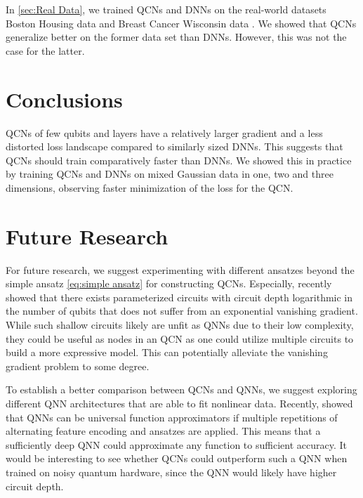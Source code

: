 In \autoref{sec:Real Data}, we trained QCNs and DNNs on the real-world datasets Boston Housing data \cite{boston} and Breast Cancer Wisconsin data \cite{cancer}. We showed that QCNs generalize better on the former data set than DNNs. However, this was not the case for the latter.  


\section{Conclusions}\label{sec:conclusion}
QCNs of few qubits and layers have a relatively larger gradient and a less distorted loss landscape compared to similarly sized DNNs. This suggests that QCNs should train comparatively faster than DNNs. We showed this in practice by training QCNs and DNNs on mixed Gaussian data in one, two and three dimensions, observing faster minimization of the loss for the QCN. 

\section{Future Research}\label{sec:future}
For future research, we suggest experimenting with different ansatzes beyond the simple ansatz \autoref{eq:simple ansatz} for constructing QCNs. Especially, \citet{Cerezo_2021} recently showed that there exists parameterized circuits with circuit depth logarithmic in the number of qubits that does not suffer from an exponential vanishing gradient. While such shallow circuits likely are unfit as QNNs due to their low complexity, they could be useful as nodes in an QCN as one could utilize multiple circuits to build a more expressive model. This can potentially alleviate the vanishing gradient problem to some degree.

To establish a better comparison between QCNs and QNNs, we suggest exploring different QNN architectures that are able to fit nonlinear data. Recently, \citet{Schuld_2021} showed that QNNs can be universal function approximators if multiple repetitions of alternating feature encoding and ansatzes are applied. This means that a sufficiently deep QNN could approximate any function to sufficient accuracy. It would be interesting to see whether QCNs could outperform such a QNN when trained on noisy quantum hardware, since the QNN would likely have higher circuit depth.

